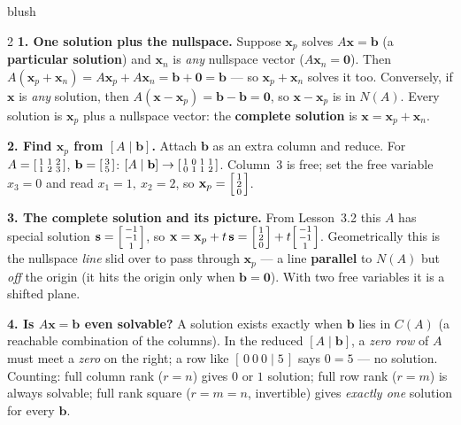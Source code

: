 \documentclass[10pt]{article}
\newcommand{\xx}{\mathbf{x}}
\newcommand{\bb}{\mathbf{b}}
\newcommand{\svec}{\mathbf{s}}
\newcommand{\zero}{\mathbf{0}}
\begin{document}
\begin{skillbox}[Lesson]{blush}
\begin{multicols}{2}
\textbf{1. One solution plus the nullspace.} Suppose $\xx_p$ solves $A\xx=\bb$ (a \textbf{particular
solution}) and $\xx_n$ is \emph{any} nullspace vector ($A\xx_n=\zero$). Then
$A(\xx_p+\xx_n)=A\xx_p+A\xx_n=\bb+\zero=\bb$ --- so $\xx_p+\xx_n$ solves it too. Conversely, if $\xx$ is
\emph{any} solution, then $A(\xx-\xx_p)=\bb-\bb=\zero$, so $\xx-\xx_p$ is in $N(A)$. Every solution is
$\xx_p$ plus a nullspace vector: the \textbf{complete solution} is $\xx=\xx_p+\xx_n$.

\textbf{2. Find $\xx_p$ from $[A\mid\bb]$.} Attach $\bb$ as an extra column and reduce. For
$A=\begin{bsmallmatrix} 1&1&2\\1&2&3 \end{bsmallmatrix}$, $\bb=\begin{bsmallmatrix} 3\\5 \end{bsmallmatrix}$:
$[A\mid\bb]\to\begin{bsmallmatrix} 1&0&1&1\\0&1&1&2 \end{bsmallmatrix}$. Column~3 is free; set the free
variable $x_3=0$ and read $x_1=1,\ x_2=2$, so $\xx_p=\begin{bsmallmatrix} 1\\2\\0 \end{bsmallmatrix}$.

\columnbreak

\textbf{3. The complete solution and its picture.} From Lesson~3.2 this $A$ has special solution
$\svec=\begin{bsmallmatrix} -1\\-1\\1 \end{bsmallmatrix}$, so
$\xx=\xx_p+t\,\svec=\begin{bsmallmatrix} 1\\2\\0 \end{bsmallmatrix}+t\begin{bsmallmatrix} -1\\-1\\1 \end{bsmallmatrix}$.
Geometrically this is the nullspace \emph{line} slid over to pass through $\xx_p$ --- a line
\textbf{parallel} to $N(A)$ but \emph{off} the origin (it hits the origin only when $\bb=\zero$). With
two free variables it is a shifted plane.

\textbf{4. Is $A\xx=\bb$ even solvable?} A solution exists exactly when $\bb$ lies in $C(A)$ (a reachable
combination of the columns). In the reduced $[A\mid\bb]$, a \emph{zero row} of $A$ must meet a \emph{zero}
on the right; a row like $[\,0\ 0\ 0\mid 5\,]$ says $0=5$ --- no solution. Counting: full column rank
($r=n$) gives $0$ or $1$ solution; full row rank ($r=m$) is always solvable; full rank square ($r=m=n$,
invertible) gives \emph{exactly one} solution for every $\bb$.
\end{multicols}
\end{skillbox}
\end{document}
